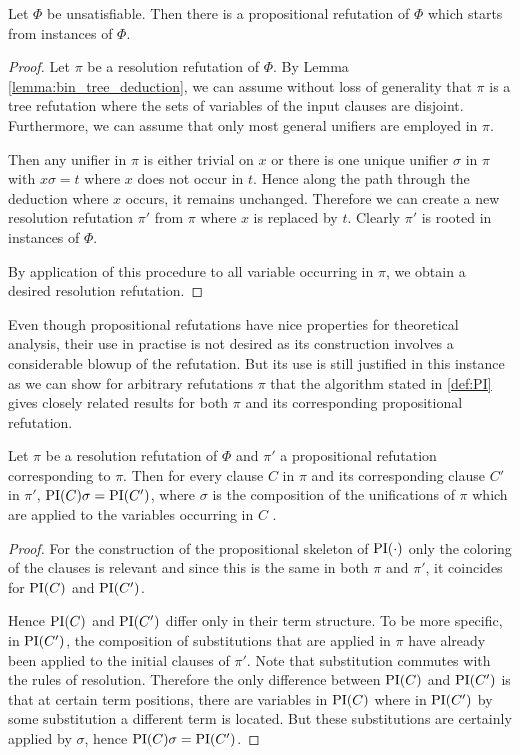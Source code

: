 \begin{lemma}
	Let $\Phi$ be unsatisfiable.
	Then there is a propositional refutation of $\Phi$ which starts from instances of $\Phi$.
\end{lemma}
\begin{proof}
	Let $\pi$ be a resolution refutation of $\Phi$.
	By Lemma \ref{lemma:bin_tree_deduction}, we can assume without loss of generality that $\pi$ is a tree refutation where the sets of variables of the input clauses are disjoint.
	Furthermore, we can assume that only most general unifiers are employed in $\pi$.

	Then any unifier in $\pi$ is either trivial on $x$ or there is one unique unifier $\sigma$ in $\pi$ with $x\sigma = t$ where $x$ does not occur in $t$.
	Hence along the path through the deduction where $x$ occurs, it remains unchanged.
	Therefore we can create a new resolution refutation $\pi'$ from $\pi$ where $x$ is replaced by $t$.
	Clearly $\pi'$ is rooted in instances of $\Phi$.

	By application of this procedure to all variable occurring in $\pi$, we obtain a desired resolution refutation.
\end{proof}

Even though propositional refutations have nice properties for theoretical analysis, their use in practise is not desired as its construction involves a considerable blowup of the refutation. 
But its use is still justified in this instance as we can show for arbitrary refutations $\pi$
that the algorithm stated in \ref{def:PI} gives closely related results for both $\pi$ and its corresponding propositional refutation.

\begin{lemma}
	Let $\pi$ be a resolution refutation of $\Phi$ and $\pi'$ a propositional refutation corresponding to $\pi$.
	Then for every clause $C$ in $\pi$ and its corresponding clause $C'$ in $\pi'$, $\operatorname{PI}(C)\sigma = \operatorname{PI}(C')$, where $\sigma$ is the composition of the unifications of $\pi$ which are applied to the variables occurring in $C$ .
\end{lemma}
\begin{proof}
	For the construction of the propositional skeleton of $\operatorname{PI}(\cdot)$ only the coloring of the clauses is relevant and since this is the same in both $\pi$ and $\pi'$, it coincides for $\operatorname{PI}(C)$ and $\operatorname{PI}(C')$.

	Hence $\operatorname{PI}(C)$ and $\operatorname{PI}(C')$ differ only in their term structure. 
	To be more specific, in $\operatorname{PI}(C')$, the composition of substitutions that are applied in $\pi$ have already been applied to the initial clauses of $\pi'$. 
	Note that substitution commutes with the rules of resolution.
	Therefore the only difference between $\operatorname{PI}(C)$ and $\operatorname{PI}(C')$ is that at certain term positions, there are variables in $\operatorname{PI}(C)$ where in $\operatorname{PI}(C')$ by some substitution a different term is located. 
	But these substitutions are certainly applied by $\sigma$, hence $\operatorname{PI}(C)\sigma = \operatorname{PI}(C')$.
\end{proof}

